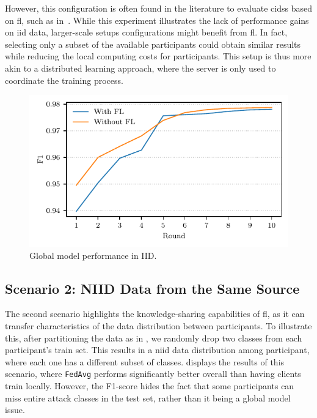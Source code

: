 However, this configuration is often found in the literature to evaluate \glspl{cids} based on \gls{fl}, such as in~\cite{aouedi_IntrusiondetectionSoftwarized_2022}. %
While this experiment illustrates the lack of performance gains on \gls{iid} data, larger-scale setups configurations might benefit from \gls{fl}.
In fact, selecting only a subset of the available participants could obtain similar results while reducing the local computing costs for participants.
This setup is thus more akin to a distributed learning approach, where the server is only used to coordinate the training process.

\begin{figure}
    \centering
    \includegraphics{figures/iid.pdf}
    \caption{Global model performance in IID.}
    \label{fig:iid}
\end{figure}


\subsection{Scenario 2: NIID Data from the Same Source\label{sec:app.demo.niid}}

The second scenario highlights the knowledge-sharing capabilities of \gls{fl}, as it can transfer characteristics of the data distribution between participants.
To illustrate this, after partitioning the data as in , we randomly drop two classes from each participant's train set.
This results in a \gls{niid} data distribution among participant, where each one has a different subset of classes.
 displays the results of this scenario, where \texttt{FedAvg} performs significantly better overall than having clients train locally.
However, the F1-score hides the fact that some participants can miss entire attack classes in the test set, rather than it being a global model issue.

